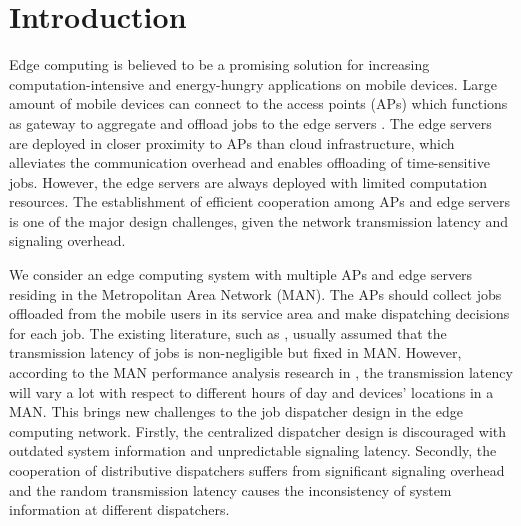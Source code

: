 
\section{Introduction}
Edge computing is believed to be a promising solution for increasing computation-intensive and energy-hungry applications on mobile devices.
Large amount of mobile devices can connect to the access points (APs) which functions as gateway to aggregate and offload jobs to the edge servers \cite{MEC-SURVEY}.
The edge servers are deployed in closer proximity to APs than cloud infrastructure, which alleviates the communication overhead and enables offloading of time-sensitive jobs.
However, the edge servers are always deployed with limited computation resources.
The establishment of efficient cooperation among APs and edge servers is one of the major design challenges, given the network transmission latency and signaling overhead.

We consider an edge computing system with multiple APs and edge servers residing in the Metropolitan Area Network (MAN).
The APs should collect jobs offloaded from the mobile users in its service area and make dispatching decisions for each job.
The existing literature, such as \cite{tan-online,MOBIHOC19-ZhouZ,IOTJ18-FanQ,TOC19-LiuC,JSAC19-AlameddineHA}, usually assumed that the transmission latency of jobs is non-negligible but fixed in MAN.
However, according to the MAN performance analysis research in \cite{MAN-LATENCY}, the transmission latency will vary a lot with respect to different hours of day and devices' locations in a MAN.
This brings new challenges to the job dispatcher design in the edge computing network.
Firstly, the centralized dispatcher design is discouraged with outdated system information and unpredictable signaling latency.
Secondly, the cooperation of distributive dispatchers suffers from significant signaling overhead and the random transmission latency causes the inconsistency of system information at different dispatchers.

